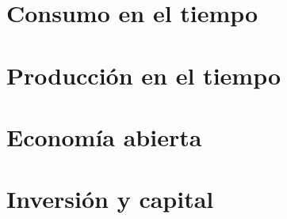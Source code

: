 \documentclass[8pt,a4paper]{extarticle}
\begin{document}
\begin{multicols}{3}
	\newpage

	\part{Consumo en el tiempo}

	\newpage

	\part{Producción en el tiempo}

	\newpage

	\part{Economía abierta}

	\newpage

	\part{Inversión y capital}

	\vfill\eject
	\columnbreak
\end{multicols}
\end{document}
